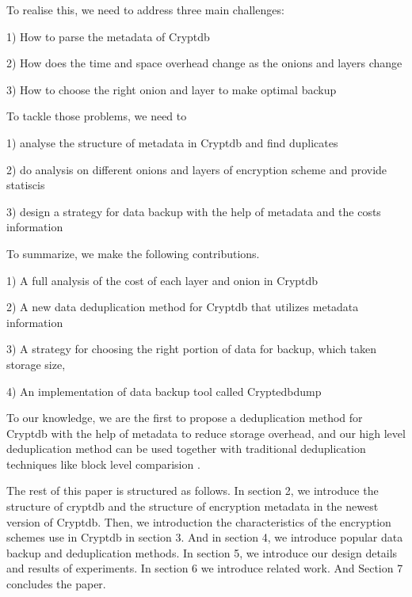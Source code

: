To realise this, we need to address three main challenges:

1) How to parse the metadata of Cryptdb

2) How  does the time and space overhead change as the onions and layers change

3) How to choose the right onion and layer to make optimal backup


To tackle those problems, we need to

1) analyse the structure of metadata in Cryptdb and find duplicates

2) do analysis on different onions and layers of encryption scheme and provide statiscis

3) design a strategy for data backup with the help of metadata and the costs information 

To summarize, we make the following contributions.

1) A full analysis of the cost of each layer and onion in Cryptdb

2) A new data deduplication method for Cryptdb that utilizes metadata information 

3) A strategy for choosing the right portion of data for backup, which taken storage size, 

4) An implementation of data backup tool called Cryptedbdump 

To our knowledge, we are the first to propose a deduplication method for Cryptdb with the help of metadata to reduce storage overhead, and our high level deduplication method can be used together with traditional deduplication techniques like block level comparision \citep{bellare2013message}.

The rest of this paper is structured as follows. In section 2, we introduce the structure of cryptdb and the structure of encryption metadata in the newest version of Cryptdb. Then, we introduction the characteristics of the encryption schemes use in Cryptdb in section 3. And in section 4, we introduce popular data backup and deduplication methods. In section 5, we introduce our design details and results of experiments. In section 6 we introduce related work. And Section 7 concludes the paper.


